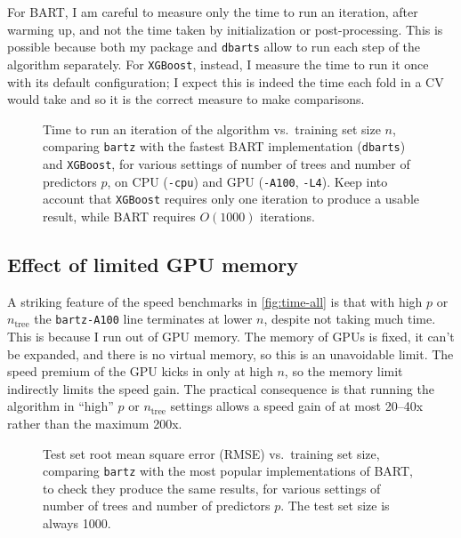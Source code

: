 \documentclass{article}
\newcommand{\widecenter}[1]{\noindent\hspace{-\textwidth}\makebox[3\textwidth][c]{#1}}
\newcommand{\includempl}[1]{\texttt{[image: \#1]}}
\let\oldmarginpar\marginpar
\renewcommand{\marginpar}[1]{\oldmarginpar{\sffamily\scriptsize #1}}
\renewcommand{\marginpar}[1]{\relax} %
\begin{document}
    For BART, I am careful to measure only the time to run an iteration, after warming up, and not the time taken by initialization or post-processing. This is possible because both my package and \texttt{dbarts} allow to run each step of the algorithm separately. For \texttt{XGBoost}, instead, I measure the time to run it once with its default configuration; I expect this is indeed the time each fold in a CV would take and so it is the correct measure to make comparisons.\marginpar{I would really like an XGBoost expert to weigh in.}

    \begin{figure}
        \widecenter{\includempl{time-all}}
        \caption{\label{fig:time-all} Time to run an iteration of the algorithm vs.\ training set size $n$, comparing \texttt{bartz} with the fastest BART implementation (\texttt{dbarts}) and \texttt{XGBoost}, for various settings of number of trees and number of predictors $p$, on CPU (\texttt{-cpu}) and GPU (\texttt{-A100}, \texttt{-L4}). Keep into account that \texttt{XGBoost} requires only one iteration to produce a usable result, while BART requires $O(1000)$ iterations.}
    \end{figure}

    \subsection{Effect of limited GPU memory}
    \label{sec:gpumem}

    A striking feature of the speed benchmarks in \autoref{fig:time-all} is that with high $p$ or $n_\text{tree}$ the \texttt{bartz-A100} line terminates at lower $n$, despite not taking much time. This is because I run out of GPU memory. The memory of GPUs is fixed, it can't be expanded, and there is no virtual memory, so this is an unavoidable limit. The speed premium of the GPU kicks in only at high $n$, so the memory limit indirectly limits the speed gain. The practical consequence is that running the algorithm in ``high'' $p$ or $n_\text{tree}$ settings allows a speed gain of at most 20--40x rather than the maximum 200x.

    \begin{figure}
        \widecenter{\includempl{rmse-all}}
        \caption{\label{fig:rmse-all} Test set root mean square error (RMSE) vs.\ training set size, comparing \texttt{bartz} with the most popular implementations of BART, to check they produce the same results, for various settings of number of trees and number of predictors $p$. The test set size is always 1000.}
    \end{figure}
\end{document}
